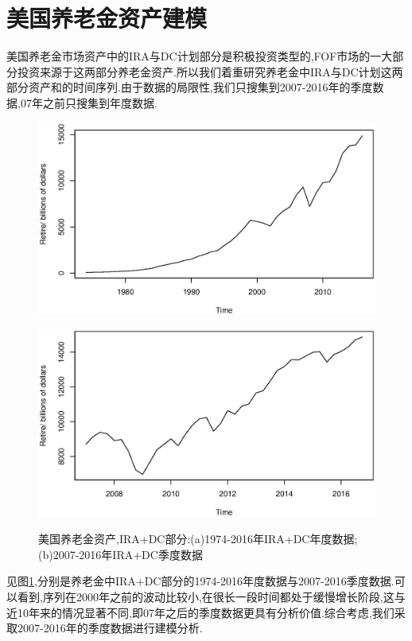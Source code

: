 \section{美国养老金资产建模}
美国养老金市场资产中的IRA与DC计划部分是积极投资类型的,FOF市场的一大部分投资来源于这两部分养老金资产.所以我们着重研究养老金中IRA与DC计划这两部分资产和的时间序列.由于数据的局限性,我们只搜集到2007-2016年的季度数据,07年之前只搜集到年度数据.
\begin{figure}[h!]
	\begin{minipage}[ht]{0.47\textwidth}
		\centering
		\includegraphics[width=1\textwidth]{pic/re/niandu}
		\subcaption{}\label{niandu}
	\end{minipage}%
	\hspace{0.06\textwidth}
	\begin{minipage}[ht]{0.47\textwidth}
		\centering
		\includegraphics[width=1\textwidth]{pic/re/jidu}
		\subcaption{}\label{jidu}
	\end{minipage}
	\caption{美国养老金资产,IRA+DC部分:(a)1974-2016年IRA+DC年度数据;(b)2007-2016年IRA+DC季度数据}\label{reshuju}
\end{figure}
见图\ref{reshuju},分别是养老金中IRA+DC部分的1974-2016年度数据与2007-2016季度数据.可以看到,序列在2000年之前的波动比较小,在很长一段时间都处于缓慢增长阶段,这与近10年来的情况显著不同,即07年之后的季度数据更具有分析价值.综合考虑,我们采取2007-2016年的季度数据进行建模分析.
